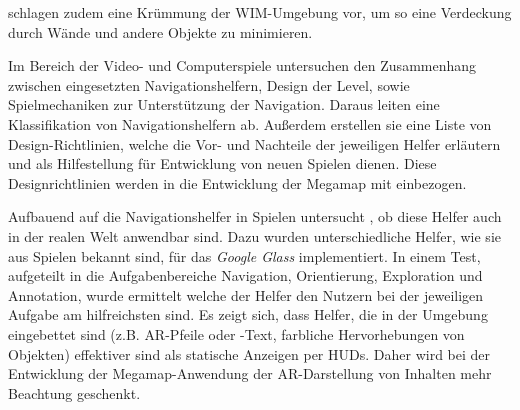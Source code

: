\textcite{Vallance2001} schlagen zudem eine Krümmung der \gls{WIM}-Umgebung vor, um so eine Verdeckung durch Wände und andere Objekte zu minimieren.

Im Bereich der Video- und Computerspiele untersuchen \textcites{Moura2014}{Moura2015} den Zusammenhang zwischen eingesetzten Navigationshelfern, Design der Level, sowie Spielmechaniken zur Unterstützung der Navigation.
Daraus leiten \textcite{Moura2015} eine Klassifikation von Navigationshelfern ab.
Außerdem erstellen sie eine Liste von Design-Richtlinien, welche die Vor- und Nachteile der jeweiligen Helfer erläutern und als Hilfestellung für Entwicklung von neuen Spielen dienen.
Diese Designrichtlinien werden in die Entwicklung der Megamap mit einbezogen.

Aufbauend auf die Navigationshelfer in Spielen untersucht \textcite{Lodts2015}, ob diese Helfer auch in der realen Welt anwendbar sind.
Dazu wurden unterschiedliche Helfer, wie sie aus Spielen bekannt sind, für das \emph{Google Glass} implementiert.
In einem Test, aufgeteilt in die Aufgabenbereiche Navigation, Orientierung, Exploration und Annotation, wurde ermittelt welche der Helfer den Nutzern bei der jeweiligen Aufgabe am hilfreichsten sind.
Es zeigt sich, dass Helfer, die in der Umgebung eingebettet sind (z.B. \gls{AR}-Pfeile oder -Text, farbliche Hervorhebungen von Objekten) effektiver sind als statische Anzeigen per \glspl{HUD}.
Daher wird bei der Entwicklung der Megamap-Anwendung der \gls{AR}-Darstellung von Inhalten mehr Beachtung geschenkt.
%
\cleardoublepage